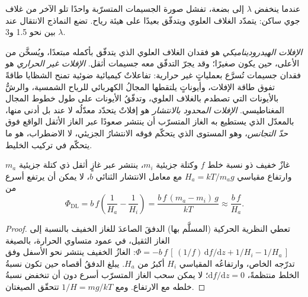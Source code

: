 
عندما ينخفض $\lambda$ إلى بضعة، تفشل صورة الجسيمات المتسرّبة واحدًا تلو الآخر
من غلاف جوي ساكن: يتمدّد الغلاف العلوي ويتدفّق
بعيدًا على هيئة رياح. تضع النماذج الانتقال عند $\lambda$ بين نحو 1.5
و3.

\begin{definition}\label{def:b3:planetary-atmospheres:hydrodynamic}
\emph{الإفلات الهيدروديناميكي} هو فقدان
الغلاف العلوي الذي يتدفّق بأكمله مبتعدًا، ويُسخَّن من الأعلى، حين يكون
 صغيرًا؛ وقد يجرّ التدفّق معه جسيمات أثقل.
\emph{الإفلات غير الحراري} هو فقدان
جسيمات تُسرَّع بعملياتٍ غير حرارية: تفاعلاتٌ كيميائية ضوئية
تمنح الشظايا طاقةً تفوق طاقة الإفلات، وأيوناتٍ يلتقطها
المجالُ الكهربائي للرياح الشمسية، والرشُّ بالأيونات التي تصطدم
بالغلاف العلوي، وتدفّقُ الأيونات على طول خطوط المجال المغناطيسي.
\emph{الإفلات المحدود بالانتشار} هو إفلاتٌ
يتحدّد معدّلُه لا عند  بل أدنى منها، بالمعدّل الذي
يستطيع به الغاز المتسرّب أن ينتشر صعودًا عبر الغاز الأثقل الواقع فوق
\emph{حدّ التجانس}، وهو المستوى الذي يتحكّم فوقه
الانتشارُ الجزيئي، لا الاضطراب، هو ما يتحكّم في تركيب الخليط.
\end{definition}

\begin{proposition}[حدّ الانتشار]\label{prop:b3:planetary-atmospheres:diffusion}
غازٌ خفيف ذو نسبة خلط $f$ وكتلة جزيئية $m_i$، ينتشر
عبر غازٍ أثقل ذي كتلة جزيئية $m_a$ وارتفاع مقياسي $H_a =
kT/m_a g$ مع معامل الانتشار الثنائي $b$، لا يمكن أن يرتفع أسرع
من
\[
\Phi_\mathrm{DL} = b\,f\left(\frac1{H_a} - \frac1{H_i}\right)
= \frac{b\,f\,(m_a - m_i)\,g}{kT} \approx \frac{b\,f}{H_a}.
\]
\end{proposition}

\begin{proof}
تعطي النظرية الحركية (المسلَّم بها) الدفقَ الصاعدَ للغاز الخفيف
بالنسبة إلى الغاز الثقيل، في عمود متساوي الحرارة، بالصيغة $\Phi = -b\,f\,
[\,(1/f)\,\mathrm df/\mathrm dz + 1/H_i - 1/H_a\,]$: الغازُ الخفيف
ينتشر نحو الأسفل وفق تدرّجه الخاص، وارتفاعُه المقياسي $H_i$ أكبرُ
من $H_a$. يبلغ الدفقُ أقصاه حين تكون نسبةُ الخلط منتظمةً، $\mathrm
df/\mathrm dz = 0$؛ لا يمكن سحب الغاز المتسرّب أسرع دون أن
تنخفض نسبةُ خلطه مع الارتفاع. ومع $1/H = mg/kT$ تتحقّق
الصيغتان.
\end{proof}

